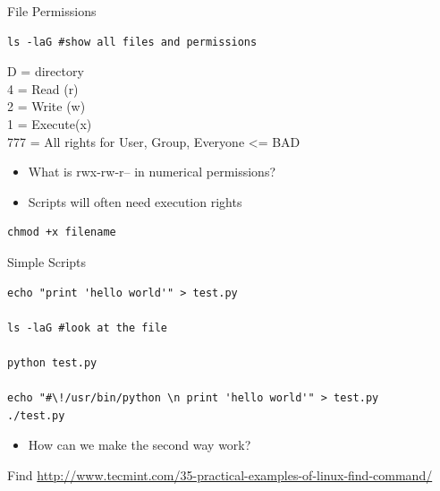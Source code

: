 \documentclass[presentation]{beamer}
\begin{document}
\begin{frame}[fragile,label=sec-3-0-6]{File Permissions}
 \lstset{numbers=left,language=sh,label= ,caption= }
\begin{lstlisting}
ls -laG #show all files and permissions
\end{lstlisting}

D = directory \\
4 = Read (r) \\
2 = Write (w) \\
1 = Execute(x) \\
777 = All rights for User, Group, Everyone <= BAD

\begin{itemize}
\item What is rwx-rw-r-- in numerical permissions?

\item Scripts will often need execution rights
\end{itemize}
\lstset{numbers=left,language=sh,label= ,caption= }
\begin{lstlisting}
chmod +x filename
\end{lstlisting}
\end{frame}

\begin{frame}[fragile,label=sec-3-0-7]{Simple Scripts}
 \lstset{numbers=left,language=sh,label= ,caption= }
\begin{lstlisting}
echo "print 'hello world'" > test.py

ls -laG #look at the file 

python test.py 

echo "#\!/usr/bin/python \n print 'hello world'" > test.py
./test.py
\end{lstlisting}

\begin{itemize}
\item How can we make the second way work?
\end{itemize}

\end{frame}



\begin{frame}[label=sec-3-0-8]{Find}
\url{http://www.tecmint.com/35-practical-examples-of-linux-find-command/}
\end{frame}
\end{document}
